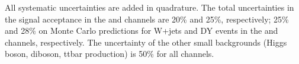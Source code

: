\noindent All systematic uncertainties are added in quadrature. The total uncertainties in the signal acceptance in the \leptonTau and \tauTau 
channels are 20\% and 25\%, respectively; 25\% and 28\% on Monte Carlo predictions for W+jets and DY events in the \leptonTau and \tauTau  channels, respectively.
The uncertainty of the other small backgrounds (Higgs boson, diboson, ttbar production) is 50\% for all channels.


